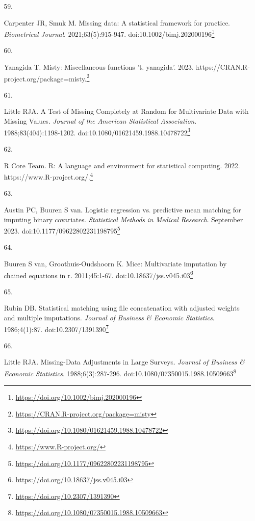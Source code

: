 \documentclass[
  a4paper,
]{book}
\newlength{\cslhangindent}
\newlength{\csllabelwidth}
\newlength{\cslentryspacingunit} %
\newenvironment{CSLReferences}[2] %
 {%
  \setlength{\parindent}{0pt}
  \ifodd #1
  \let\oldpar\par
  \def\par{\hangindent=\cslhangindent\oldpar}
  \fi
  \setlength{\parskip}{#2\cslentryspacingunit}
 }%
 {}
\newcommand{\CSLLeftMargin}[1]{\parbox[t]{\csllabelwidth}{#1}}
\newcommand{\CSLRightInline}[1]{\parbox[t]{\linewidth - \csllabelwidth}{#1}\break}
\renewcommand{\href}[2]{#2\footnote{\url{#1}}}
\begin{document}
\begin{CSLReferences}{0}{0}
\leavevmode{}%
\CSLLeftMargin{59. }%
\CSLRightInline{Carpenter JR, Smuk M. Missing data: A statistical framework for practice. \emph{Biometrical Journal}. 2021;63(5):915-947. doi:\href{https://doi.org/10.1002/bimj.202000196}{10.1002/bimj.202000196}}

\leavevmode{}%
\CSLLeftMargin{60. }%
\CSLRightInline{Yanagida T. Misty: Miscellaneous functions 't. yanagida'. 2023. \href{https://CRAN.R-project.org/package=misty}{https://CRAN.R-project.org/package=misty.}}

\leavevmode{}%
\CSLLeftMargin{61. }%
\CSLRightInline{Little RJA. A Test of Missing Completely at Random for Multivariate Data with Missing Values. \emph{Journal of the American Statistical Association}. 1988;83(404):1198-1202. doi:\href{https://doi.org/10.1080/01621459.1988.10478722}{10.1080/01621459.1988.10478722}}

\leavevmode{}%
\CSLLeftMargin{62. }%
\CSLRightInline{R Core Team. R: A language and environment for statistical computing. 2022. \href{https://www.R-project.org/}{https://www.R-project.org/.}}

\leavevmode{}%
\CSLLeftMargin{63. }%
\CSLRightInline{Austin PC, Buuren S van. Logistic regression vs. predictive mean matching for imputing binary covariates. \emph{Statistical Methods in Medical Research}. September 2023. doi:\href{https://doi.org/10.1177/09622802231198795}{10.1177/09622802231198795}}

\leavevmode{}%
\CSLLeftMargin{64. }%
\CSLRightInline{Buuren S van, Groothuis-Oudshoorn K. {\textbraceleft}Mice{\textbraceright}: Multivariate imputation by chained equations in r. 2011;45:1-67. doi:\href{https://doi.org/10.18637/jss.v045.i03}{10.18637/jss.v045.i03}}

\leavevmode{}%
\CSLLeftMargin{65. }%
\CSLRightInline{Rubin DB. Statistical matching using file concatenation with adjusted weights and multiple imputations. \emph{Journal of Business \& Economic Statistics}. 1986;4(1):87. doi:\href{https://doi.org/10.2307/1391390}{10.2307/1391390}}

\leavevmode{}%
\CSLLeftMargin{66. }%
\CSLRightInline{Little RJA. Missing-Data Adjustments in Large Surveys. \emph{Journal of Business \& Economic Statistics}. 1988;6(3):287-296. doi:\href{https://doi.org/10.1080/07350015.1988.10509663}{10.1080/07350015.1988.10509663}}


\end{CSLReferences}
\end{document}

